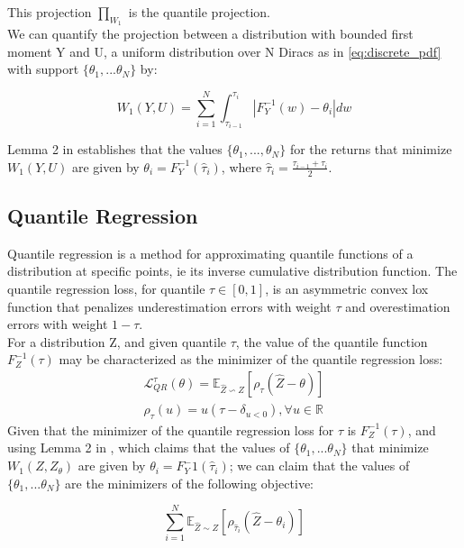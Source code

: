 This projection $\prod_ {W_1}$ is the quantile projection.\\
We can quantify the projection between a distribution with bounded first moment Y and U, a uniform distribution
over N Diracs as in \eqref{eq:discrete_pdf} with support $\{\theta_1, ... \theta_N\}$ by:

\begin{equation}
    W_1(Y,U)= \sum_{i=1}^{N}\int_{\tau_{i-1}}^{\tau_i} |   F_Y^{-1}(w)-\theta_i   |dw
\end{equation}

Lemma 2 in \cite{Dabney2018} establishes that the values $\{\theta_1, ... ,\theta_N\}$ for the returns  that minimize 
$W_1(Y,U)$ are given by $\theta_i = F_Y^{-1}(\hat\tau_i)$, where $\hat\tau_i=\frac{\tau_{i-1}+\tau_i}{2}$.

\subsection{Quantile Regression}
Quantile regression is a method for approximating quantile functions of a distribution at specific points, ie its inverse
cumulative distribution function.
The quantile regression loss, for quantile $\tau \in [0,1]$, is an asymmetric convex lox function
that penalizes underestimation errors with weight $\tau$ and overestimation errors
with weight $1-\tau$. \\
For a distribution Z, and given quantile $\tau$, the value of the quantile function $F_Z^{-1}(\tau)$
may be characterized as the minimizer of the quantile regression loss:
\begin{eqnarray}
    \mathcal{L}_{QR}^{\tau}(\theta)=\mathbb E_{\hat{Z}\backsim Z}[\rho_\tau(\hat{Z}-\theta) ]\\
    \rho_\tau(u)=u(\tau - \delta_{u<0}) , \forall u \in \mathbb{R} \label{eq:quantile_loss}
\end{eqnarray}
Given that the minimizer of the quantile regression loss for $\tau$ is $F_Z^{-1}(\tau)$, and using Lemma 2 in \cite{Dabney2018},
which claims that the values of $\{\theta_1, ... \theta_N\}$ that minimize
 $W_1(Z,Z_\theta)$ are given by $\theta_i = F_Y^-1(\hat\tau_i)$; we can claim that
 the values of $\{\theta_1, ... \theta_N\}$ are the minimizers of the following objective:

\begin{equation}
    \sum_{i=1}^{N} \mathbb E_{\hat{Z} \sim Z} [ \rho_{\hat\tau_i}(\hat{Z}-\theta_i)]
\end{equation}

